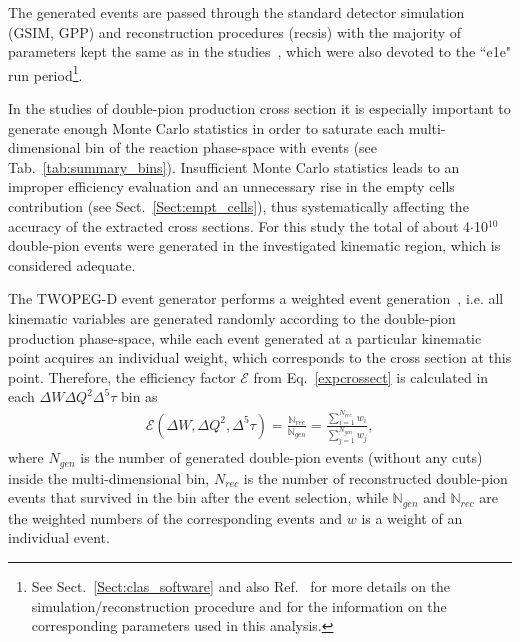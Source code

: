 The generated events are passed through the standard detector simulation (GSIM, GPP) and reconstruction procedures (recsis) with the majority of parameters kept the same as in the studies~\cite{Fed_an_note:2017,Markov:2014}, which were also devoted to the ``e1e" run period\footnote[13]{See Sect.~\ref{Sect:clas_software} and also Ref.~\cite{my_an_note:2020} for more details on the simulation/reconstruction procedure and for the information on the corresponding parameters used in this analysis.}.


In the studies of double-pion production cross section it is especially important to generate enough Monte Carlo statistics in order to saturate each multi-dimensional bin of the reaction phase-space with events (see Tab.~\ref{tab:summary_bins}). Insufficient Monte Carlo statistics leads to an improper efficiency evaluation and an unnecessary rise in the empty cells contribution (see Sect.~\ref{Sect:empt_cells}), thus systematically affecting the accuracy of the extracted cross sections. For this study the total of about 4$\cdot$10$^{10}$ double-pion events were generated in the investigated kinematic region, which is considered adequate.

The TWOPEG-D event generator performs a weighted event generation~\cite{twopeg}, i.e. all kinematic variables are generated randomly according to the double-pion production phase-space, while each event generated at a particular kinematic point acquires an individual weight, which corresponds to the cross section at this point.  Therefore, the efficiency factor $\mathcal{E}$ from Eq.~\eqref{expcrossect} is calculated in each $\Delta W\Delta Q^2\Delta^{5}\tau$ bin as\vspace{-0.5em}
\begin{equation}
\begin{aligned}
\mathcal{E}(\Delta W, \Delta Q^2, \Delta^{5}\tau) = \frac{\mathbb{N}_{rec}}{\mathbb{N}_{gen}} =  \frac{\sum\limits_{i=1}^{N_{rec}} w_{i}}{\sum\limits_{j=1}^{N_{gen}} w_{j}} ,
\end{aligned}
\label{eq:eff}
\end{equation}
where $N_{gen}$ is the number of generated double-pion events (without any cuts) inside the multi-dimensional bin, $N_{rec}$ is the number of reconstructed double-pion events that survived in the bin after the event selection, while $\mathbb{N}_{gen}$ and  $\mathbb{N}_{rec}$ are the weighted numbers of the corresponding events and $w$ is a weight of an individual event.

